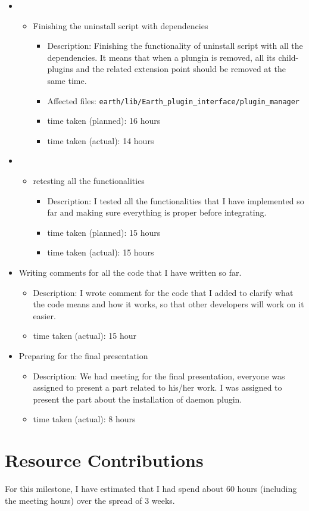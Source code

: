 \begin{itemize}
	\item  
	     \begin{itemize}
	        \item Finishing the uninstall script with dependencies
	           \begin{itemize}
					\item Description: Finishing the functionality of uninstall script with all the dependencies. It means that when a plungin is removed, all its child-plugins and the related extension point should be removed at the same time.
				
					\item Affected files: \texttt{earth/lib/Earth\_plugin\_interface/plugin\_manager}
					\item  time taken (planned): 16 hours
					\item  time taken (actual): 14 hours
				\end{itemize}
			
	     \end{itemize}
	\item 
	     \begin{itemize}
	         \item retesting all the functionalities
	            \begin{itemize}
	              \item Description: I tested all the functionalities that I have implemented so far and making sure everything is proper before integrating. 
					\item time taken (planned): 15 hours
					\item time taken (actual): 15 hours
				 \end{itemize}
	     \end{itemize}
	\item Writing comments for all the code that I have written so far.
	     \begin{itemize}
	         \item Description: I wrote comment for the code that I added to clarify what the code means and how it works, so that other developers will work on it easier.
	        
	         \item time taken (actual): 15 hour
	     \end{itemize}
	\item Preparing for the final presentation
	     \begin{itemize}
	         \item Description: We had meeting for the final presentation, everyone was assigned to present a part related to his/her work. I was assigned to present the part about the installation of daemon plugin.
	       
	         \item time taken (actual): 8 hours
	     \end{itemize}

\end{itemize}

\section*{Resource Contributions}

For this milestone, I have estimated that I had spend about 60 hours (including the meeting hours) over the spread of 3 weeks. 

